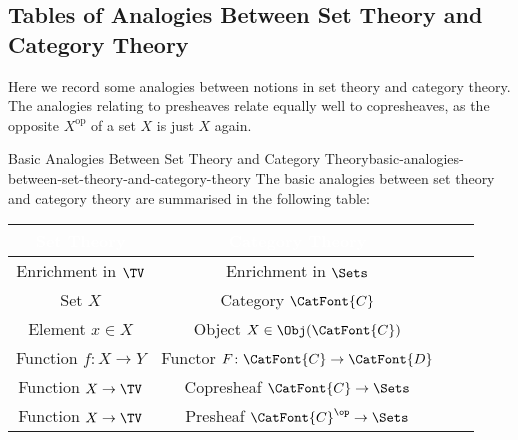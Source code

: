 \subsection{Tables of Analogies Between Set Theory and Category Theory}\label{subsection-table-of-analogies-between-set-theory-and-category-theory}
Here we record some analogies between notions in set theory and category theory. The analogies relating to presheaves relate equally well to copresheaves, as the opposite $X^{\mathrm{op}}$ of a set $X$ is just $X$ again.
\begin{remark}{Basic Analogies Between Set Theory and Category Theory}{basic-analogies-between-set-theory-and-category-theory}%
    The basic analogies between set theory and category theory are summarised in the following table:
    \begingroup%
    \renewcommand{\arraystretch}{1.2}
    \begin{center}
        \begin{tabular}{|Sc|Sc|}\hline{}
            \textcolor{white}{\textbf{Set Theory}} & \textcolor{white}{\textbf{Category Theory}} \\\hline{}
            Enrichment in $\TV$                    & Enrichment in $\Sets$                       \\
            Set $X$                                & Category $\CatFont{C}$                      \\
            Element $x\in X$                       & Object $X\in\Obj(\CatFont{C})$              \\
            Function $f\colon X\to Y$              & Functor $F\colon\CatFont{C}\to\CatFont{D}$  \\
            Function $X\to\TV$                     & Copresheaf $\CatFont{C}\to\Sets$            \\
            Function $X\to\TV$                     & Presheaf $\CatFont{C}^{\op}\to\Sets$        \\\hline
        \end{tabular}
    \end{center}
    \endgroup
\end{remark}
